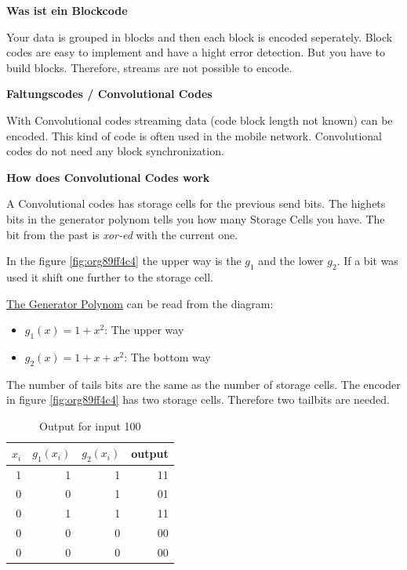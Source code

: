 \documentclass[11pt,twoside,twocolumn,landscape]{article}
\begin{document}
\textbf{Was ist ein Blockcode}

Your data is grouped in blocks and then each block is encoded seperately.
Block codes are easy to implement and have a hight error detection.
But you have to build blocks.
Therefore, streams are not possible to encode.

\textbf{Faltungscodes / Convolutional Codes}

With Convolutional codes streaming data (code block length not known) can be encoded.
This kind of code is often used in the mobile network.
Convolutional codes do not need any block synchronization.

\textbf{How does Convolutional Codes work}

A Convolutional codes has storage cells for the previous send bits.
The highets bits in the generator polynom tells you how many Storage Cells you have.
The bit from the past is \emph{xor-ed} with the current one.

In the figure \ref{fig:org89ff4c4}  the upper way is the \(g_1\) and the lower \(g_2\).
If a bit was used it shift one further to the storage cell.

\href{../../../roam/20211105145648-the_generator_polynom_for_hamming_codes.org}{The Generator Polynom} can be read from the diagram:
\begin{itemize}
\item \(g_1(x) = 1 + x^2\): The upper way
\item \(g_2(x) = 1 + x + x^2\): The bottom way
\end{itemize}


The number of tails bits are the same as the number of storage cells.
The encoder in figure \ref{fig:org89ff4c4} has two storage cells.
Therefore two tailbits are needed.


\begin{table}[htbp]
\caption{\label{tab:org1be964a}Output for input 100}
\centering
\begin{tabular}{rrrr}
\(x_i\) & \(g_1(x_i)\) & \(g_2(x_i)\) & output\\
\hline
1 & 1 & 1 & 11\\
0 & 0 & 1 & 01\\
0 & 1 & 1 & 11\\
0 & 0 & 0 & 00\\
0 & 0 & 0 & 00\\
\end{tabular}
\end{table}
\end{document}
